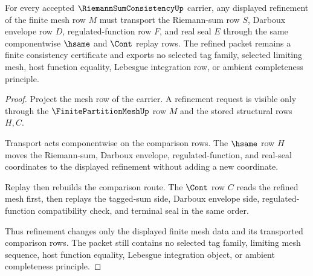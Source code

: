 \begin{theorem}
\label{thm:riemann-sum-consistency-mesh-refinement}
For every accepted $\RiemannSumConsistencyUp$ carrier, any displayed refinement of the finite mesh row $M$ must transport the Riemann-sum row $S$, Darboux envelope row $D$, regulated-function row $F$, and real seal $E$ through the same componentwise $\hsame$ and $\Cont$ replay rows. The refined packet remains a finite consistency certificate and exports no selected tag family, selected limiting mesh, host function equality, Lebesgue integration row, or ambient completeness principle.
\end{theorem}
\begin{proof}
Project the mesh row of the carrier. A refinement request is visible only through the $\FinitePartitionMeshUp$ row $M$ and the stored structural rows $H,C$.

Transport acts componentwise on the comparison rows. The $\hsame$ row $H$ moves the Riemann-sum, Darboux envelope, regulated-function, and real-seal coordinates to the displayed refinement without adding a new coordinate.

Replay then rebuilds the comparison route. The $\Cont$ row $C$ reads the refined mesh first, then replays the tagged-sum side, Darboux envelope side, regulated-function compatibility check, and terminal seal in the same order.

Thus refinement changes only the displayed finite mesh data and its transported comparison rows. The packet still contains no selected tag family, limiting mesh sequence, host function equality, Lebesgue integration object, or ambient completeness principle.
\end{proof}


\begin{closurestatus}{\RiemannSumConsistencyUp}
  \theoryclosure{\seedClosure}
  \formalstatus{\unformalizedV}
\end{closurestatus}
